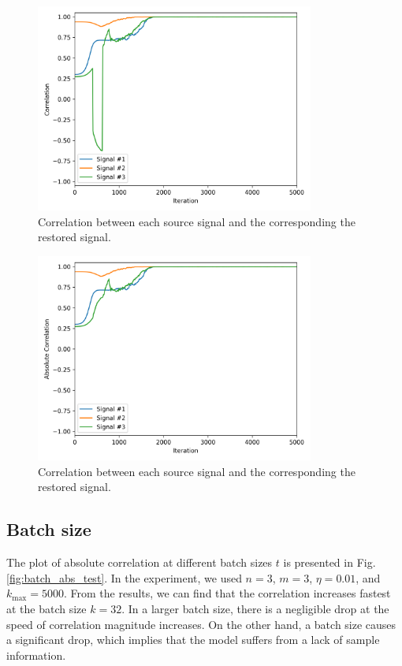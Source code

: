 \documentclass[conference]{IEEEtran}
\begin{document}
\begin{figure}[!t]
	\centering
	\includegraphics[width=3.6in]{basic_test.png}	
	\caption{Correlation between each source signal and the corresponding the restored signal.}
	\label{fig:basic_test}
\end{figure}

\begin{figure}[!t]
	\centering
	\includegraphics[width=3.6in]{basic_abs_test.png}	
	\caption{Correlation between each source signal and the corresponding the restored signal.}
	\label{fig:basic_abs_test}
\end{figure}

\subsection{Batch size}

The plot of absolute correlation at different batch sizes $t$ is presented in Fig. \ref{fig:batch_abs_test}.
In the experiment, we used $n=3$, $m=3$, $\eta=0.01$, and $k_{\text{max}} = 5000$.
From the results, we can find that the correlation increases fastest at the batch size $k=32$. In a larger batch size, there is a negligible drop at the speed of correlation magnitude increases. On the other hand, a batch size causes a significant drop, which implies that the model suffers from a lack of sample information.
\end{document}
